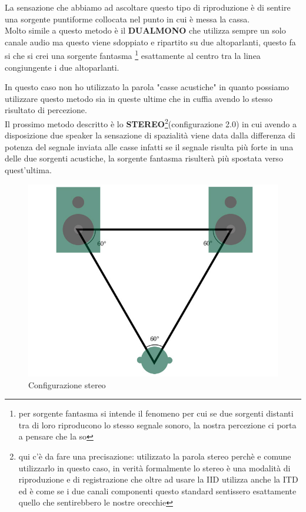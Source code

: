\documentclass[12pt,a4paper]{report}
\begin{document}
La sensazione che abbiamo ad ascoltare questo tipo di riproduzione è di sentire una sorgente puntiforme collocata nel punto in cui è messa la cassa.\\

Molto simile a questo metodo è il \textbf{DUALMONO} che utilizza sempre un solo canale audio ma questo viene sdoppiato e ripartito su due altoparlanti, questo fa si che si crei una sorgente fantasma \footnote{per sorgente fantasma si intende il fenomeno per cui se due sorgenti distanti tra di loro riproducono lo stesso segnale sonoro, la nostra percezione ci porta a pensare che la so} esattamente al centro tra la linea congiungente i due altoparlanti. 

In questo caso non ho utilizzato la parola "casse acustiche" in quanto possiamo utilizzare questo metodo sia in queste ultime che in cuffia avendo lo stesso risultato di percezione.\\

Il prossimo metodo descritto è lo \textbf{STEREO}\footnote{qui c'è da fare una precisazione: utilizzato la parola stereo perchè e comune utilizzarlo in questo caso, in verità formalmente lo stereo è una modalità di riproduzione e di registrazione che oltre ad usare la IID utilizza anche la ITD ed è come se i due canali componenti questo standard sentissero esattamente quello che sentirebbero le nostre orecchie}(configurazione 2.0) in cui avendo a disposizione due speaker la sensazione di spazialità viene data dalla differenza di potenza del segnale inviata alle casse infatti se il segnale risulta più forte in una delle due sorgenti acustiche, la sorgente fantasma risulterà più spostata verso quest'ultima.

\begin{figure}[htbp]
	\centering
	\includegraphics[scale=0.30]{figures/stereo.jpg}
	\caption {Configurazione stereo} 
	\label{fig:stereo}
	\end{figure}
\end{document}
